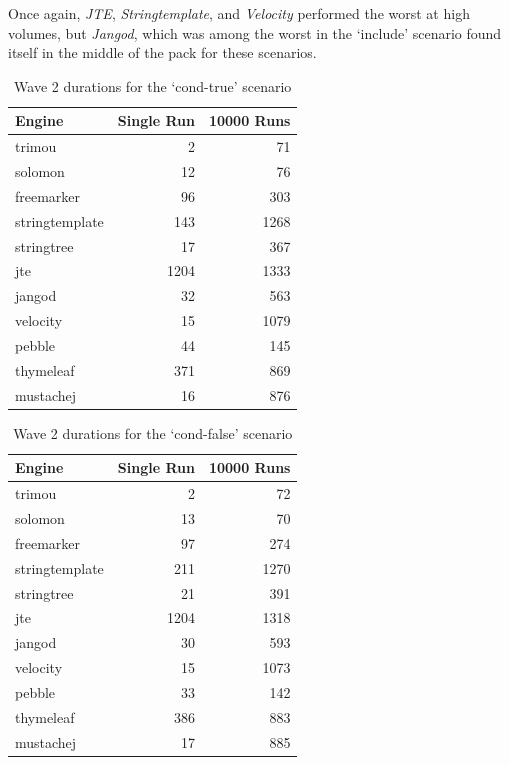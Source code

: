 Once again, \emph{JTE}, \emph{Stringtemplate}, and \emph{Velocity} performed the worst at high volumes, but \emph{Jangod}, which was among the worst in the `include' scenario found itself in the middle of the pack for these scenarios.

\begin{table}[ht!]
\centering
\begin{tabular}{lrr}
\textbf{Engine} & \textbf{Single Run} & \textbf{10000 Runs} \\
\hline
trimou & 2 & 71 \\
solomon & 12 & 76 \\
freemarker & 96 & 303 \\
stringtemplate & 143 & 1268 \\
stringtree & 17 & 367 \\
jte & 1204 & 1333 \\
jangod & 32 & 563 \\
velocity & 15 & 1079 \\
pebble & 44 & 145 \\
thymeleaf & 371 & 869 \\
mustachej & 16 & 876 \\
\end{tabular}
\caption{Wave 2 durations for the `cond-true' scenario\label{w2:results:cond-true}}
\end{table}

\begin{table}[ht!]
\centering
\begin{tabular}{lrr}
\textbf{Engine} & \textbf{Single Run} & \textbf{10000 Runs} \\
\hline
trimou & 2 & 72 \\
solomon & 13 & 70 \\
freemarker & 97 & 274 \\
stringtemplate & 211 & 1270 \\
stringtree & 21 & 391 \\
jte & 1204 & 1318 \\
jangod & 30 & 593 \\
velocity & 15 & 1073 \\
pebble & 33 & 142 \\
thymeleaf & 386 & 883 \\
mustachej & 17 & 885 \\
\end{tabular}
\caption{Wave 2 durations for the `cond-false' scenario\label{w2:results:cond-false}}
\end{table}

